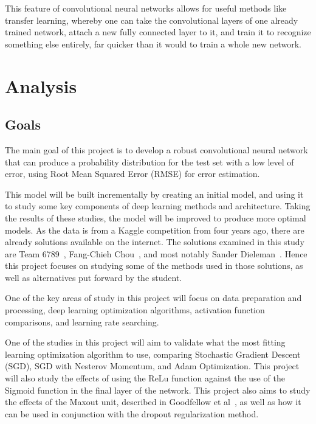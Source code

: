\documentclass[12pt,a4paper,oneside,oldfontcommands]{memoir}
\begin{document}
This feature of convolutional neural networks allows for useful methods like transfer learning, whereby one can take the convolutional layers of one already trained network, attach a new fully connected layer to it, and train it to recognize something else entirely, far quicker than it would to train a whole new network.


\chapter{Analysis}

\section{Goals}

The main goal of this project is to develop a robust convolutional neural network that can produce a probability distribution for the test set with a low level of error, using Root Mean Squared Error (RMSE) for error estimation.

This model will be built incrementally by creating an initial model, and using it to study some key components of deep learning methods and architecture. Taking the results of these studies, the model will be improved to produce more optimal models. As the data is from a Kaggle competition from four years ago, there are already solutions available on the internet. The solutions examined in this study are Team 6789~\cite{Nguyen}, Fang-Chieh Chou~\cite{Fang}, and most notably Sander Dieleman~\cite{Sanders-GZ}. Hence this project focuses on studying some of the methods used in those solutions, as well as alternatives put forward by the student.

One of the key areas of study in this project will focus on data preparation and processing, deep learning optimization algorithms, activation function comparisons, and learning rate searching.

One of the studies in this project will aim to validate what the most fitting learning optimization algorithm to use, comparing Stochastic Gradient Descent (SGD), SGD with Nesterov Momentum, and Adam Optimization. This project will also study the effects of using the ReLu function against the use of the Sigmoid function in the final layer of the network. This project also aims to study the effects of the Maxout unit, described in Goodfellow et al~\cite{maxout}, as well as how it can be used in conjunction with the dropout regularization method.
\end{document}
